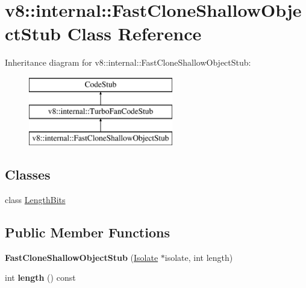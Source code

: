 \hypertarget{classv8_1_1internal_1_1_fast_clone_shallow_object_stub}{}\section{v8\+:\+:internal\+:\+:Fast\+Clone\+Shallow\+Object\+Stub Class Reference}
\label{classv8_1_1internal_1_1_fast_clone_shallow_object_stub}
Inheritance diagram for v8\+:\+:internal\+:\+:Fast\+Clone\+Shallow\+Object\+Stub\+:\begin{figure}[H]
\begin{center}
\leavevmode
\includegraphics[height=3.000000cm]{classv8_1_1internal_1_1_fast_clone_shallow_object_stub}
\end{center}
\end{figure}
\subsection*{Classes}
\begin{DoxyCompactItemize}
\item 
class \hyperlink{classv8_1_1internal_1_1_fast_clone_shallow_object_stub_1_1_length_bits}{Length\+Bits}
\end{DoxyCompactItemize}
\subsection*{Public Member Functions}
\begin{DoxyCompactItemize}
\item 
{\bfseries Fast\+Clone\+Shallow\+Object\+Stub} (\hyperlink{classv8_1_1internal_1_1_isolate}{Isolate} $\ast$isolate, int length)\hypertarget{classv8_1_1internal_1_1_fast_clone_shallow_object_stub_a239d172f31642cae167ee732745d65e4}{}\label{classv8_1_1internal_1_1_fast_clone_shallow_object_stub_a239d172f31642cae167ee732745d65e4}

\item 
int {\bfseries length} () const \hypertarget{classv8_1_1internal_1_1_fast_clone_shallow_object_stub_a346a73565eb143b68cdeab68c5b553d4}{}\label{classv8_1_1internal_1_1_fast_clone_shallow_object_stub_a346a73565eb143b68cdeab68c5b553d4}

\end{DoxyCompactItemize}

